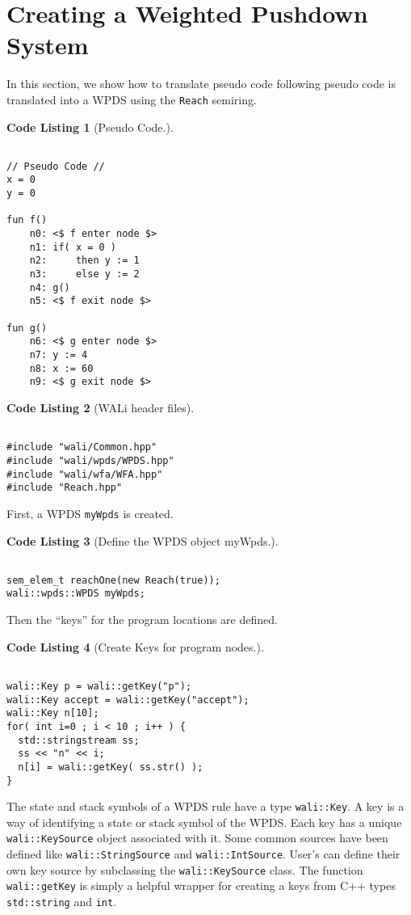 \documentclass[english,a4paper,11pt]{article}
\theoremstyle{definition}
\newtheorem{codelist}{Code Listing}[section]
\def\WALi{\textsf{WALi}\xspace}
\begin{document}
\section{Creating a Weighted Pushdown System}
In this section, we show how to translate pseudo code 
following pseudo code is translated
into a WPDS using the \verb!Reach! semiring.
\begin{codelist}[Pseudo Code.]
\label{Fi:PseudoCode}
\begin{lstlisting}

// Pseudo Code //
x = 0
y = 0

fun f()
    n0: <$ f enter node $>
    n1: if( x = 0 )
    n2:     then y := 1
    n3:     else y := 2
    n4: g()
    n5: <$ f exit node $>

fun g()
    n6: <$ g enter node $>
    n7: y := 4
    n8: x := 60
    n9: <$ g exit node $>
\end{lstlisting}
\end{codelist}

\begin{codelist}[\WALi header files]
\label{ExReach}
\begin{lstlisting}

#include "wali/Common.hpp"
#include "wali/wpds/WPDS.hpp"
#include "wali/wfa/WFA.hpp"
#include "Reach.hpp"
\end{lstlisting}
\end{codelist}

First, a WPDS \verb!myWpds! is created. 
\begin{codelist}[Define the WPDS object myWpds.]
\label{myWpds}
\begin{lstlisting}

sem_elem_t reachOne(new Reach(true));
wali::wpds::WPDS myWpds;
\end{lstlisting}
\end{codelist}

Then the ``keys'' for the program locations are defined.
\begin{codelist}[Create Keys for program nodes.]
\label{Keys}
\begin{lstlisting}

wali::Key p = wali::getKey("p");
wali::Key accept = wali::getKey("accept");
wali::Key n[10];
for( int i=0 ; i < 10 ; i++ ) {
  std::stringstream ss;
  ss << "n" << i;
  n[i] = wali::getKey( ss.str() );
}
\end{lstlisting}
\end{codelist}
The state and stack symbols of a WPDS rule have a type \verb!wali::Key!. A key
is a way of identifying a state or stack symbol of the WPDS. Each key has a
unique \verb!wali::KeySource! object associated with it. Some common sources
have been defined like \verb!wali::StringSource! and \verb!wali::IntSource!.
User's can define their own key source by subclassing the
\verb!wali::KeySource! class. The function \verb!wali::getKey! is simply a
helpful wrapper for creating a keys from C++ types \verb!std::string! and
\verb!int!. 
\end{document}
